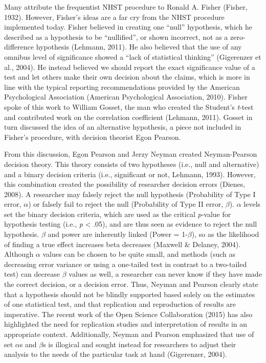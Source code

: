 \documentclass[,man, mask]{apa6}
\begin{document}
Many attribute the frequentist NHST procedure to Ronald A. Fisher (Fisher, 1932). However, Fisher's ideas are a far cry from the NHST procedure implemented today. Fisher believed in creating one \enquote{null} hypothesis, which he described as a hypothesis to be \enquote{nullified}, or shown incorrect, not as a zero-difference hypothesis (Lehmann, 2011). He also believed that the use of any omnibus level of significance showed a \enquote{lack of statistical thinking} (Gigerenzer et al., 2004). He instead believed we should report the exact significance value of a test and let others make their own decision about the claims, which is more in line with the typical reporting recommendations provided by the American Psychological Association (American Psychological Association, 2010). Fisher spoke of this work to William Gosset, the man who created the Student's \emph{t}-test and contributed work on the correlation coefficient (Lehmann, 2011). Gosset in turn discussed the idea of an alternative hypothesis, a piece not included in Fisher's procedure, with decision theorist Egon Pearson.

From this discussion, Egon Pearson and Jerzy Neyman created Neyman-Pearson decision theory. This theory consists of two hypotheses (i.e., null and alternative) and a binary decision criteria (i.e., significant or not, Lehmann, 1993). However, this combination created the possibility of researcher decision errors (Dienes, 2008). A researcher may falsely reject the null hypothesis (Probability of Type I error, \(\alpha\)) or falsely fail to reject the null (Probability of Type II error, \(\beta\)). \(\alpha\) levels set the binary decision criteria, which are used as the critical \emph{p}-value for hypothesis testing (i.e., \emph{p} \textless{} .05), and are thus seen as evidence to reject the null hypothesis. \(\beta\) and power are inherently linked (Power = 1-\(\beta\)), so as the likelihood of finding a true effect increases beta decreases (Maxwell \& Delaney, 2004). Although \(\alpha\) values can be chosen to be quite small, and methods (such as decreasing error variance or using a one-tailed test in contrast to a two-tailed test) can decrease \(\beta\) values as well, a researcher can never know if they have made the correct decision, or a decision error. Thus, Neyman and Pearson clearly state that a hypothesis should not be blindly supported based solely on the estimates of one statistical test, and that replication and reproduction of results are imperative. The recent work of the Open Science Collaboration (2015) has also highlighted the need for replication studies and interpretation of results in an appropriate context. Additionally, Neyman and Pearson emphasized that use of set \(\alpha\)s and \(\beta\)s is illogical and sought instead for researchers to adjust their analysis to the needs of the particular task at hand (Gigerenzer, 2004).
\end{document}
